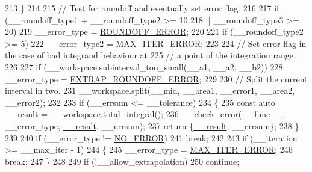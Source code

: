 \begin{DoxyCode}
213             \}
214 
215           \textcolor{comment}{// Test for roundoff and eventually set error flag.}
216 
217           \textcolor{keywordflow}{if} (\_\_roundoff\_type1 + \_\_roundoff\_type2 >= 10
218            || \_\_roundoff\_type3 >= 20)
219             \_\_error\_type = \hyperlink{namespace____gnu__cxx_ad6c62dd86a596716cece6ac2d4cfd4b3a29574de87143c7715e9a138d7340e8ae}{ROUNDOFF\_ERROR};
220 
221           \textcolor{keywordflow}{if} (\_\_roundoff\_type2 >= 5)
222             \_\_error\_type2 = \hyperlink{namespace____gnu__cxx_ad6c62dd86a596716cece6ac2d4cfd4b3a420d46d10205dd953d0ccce5323afc4c}{MAX\_ITER\_ERROR};
223 
224           \textcolor{comment}{// Set error flag in the case of bad integrand behaviour at}
225           \textcolor{comment}{// a point of the integration range.}
226 
227           \textcolor{keywordflow}{if} (\_\_workspace.subinterval\_too\_small(\_\_a1, \_\_a2, \_\_b2))
228             \_\_error\_type = \hyperlink{namespace____gnu__cxx_ad6c62dd86a596716cece6ac2d4cfd4b3ac3b74f0b40291f29a3cb3a188412308b}{EXTRAP\_ROUNDOFF\_ERROR};
229 
230           \textcolor{comment}{// Split the current interval in two.}
231           \_\_workspace.split(\_\_mid, \_\_area1, \_\_error1, \_\_area2, \_\_error2);
232 
233           \textcolor{keywordflow}{if} (\_\_errsum <= \_\_tolerance)
234             \{
235               \textcolor{keyword}{const} \textcolor{keyword}{auto} \hyperlink{namespace____gnu__cxx_a500ea9f53aeaecd8c2ae657503450578}{\_\_result} = \_\_workspace.total\_integral();
236               \hyperlink{namespace____gnu__cxx_a370fd142548c2e9e39e69282b4603317}{\_\_check\_error}(\_\_func\_\_, \_\_error\_type, \hyperlink{namespace____gnu__cxx_a500ea9f53aeaecd8c2ae657503450578}{\_\_result}, \_\_errsum);
237               \textcolor{keywordflow}{return} \{\hyperlink{namespace____gnu__cxx_a500ea9f53aeaecd8c2ae657503450578}{\_\_result}, \_\_errsum\};
238             \}
239 
240           \textcolor{keywordflow}{if} (\_\_error\_type != \hyperlink{namespace____gnu__cxx_ad6c62dd86a596716cece6ac2d4cfd4b3ac31eecc280b10dec2efb4a2216ccc2e0}{NO\_ERROR})
241             \textcolor{keywordflow}{break};
242 
243           \textcolor{keywordflow}{if} (\_\_iteration >= \_\_max\_iter - 1)
244             \{
245               \_\_error\_type = \hyperlink{namespace____gnu__cxx_ad6c62dd86a596716cece6ac2d4cfd4b3a420d46d10205dd953d0ccce5323afc4c}{MAX\_ITER\_ERROR};
246               \textcolor{keywordflow}{break};
247             \}
248 
249           \textcolor{keywordflow}{if} (!\_\_allow\_extrapolation)
250             \textcolor{keywordflow}{continue};

\end{DoxyCode}
